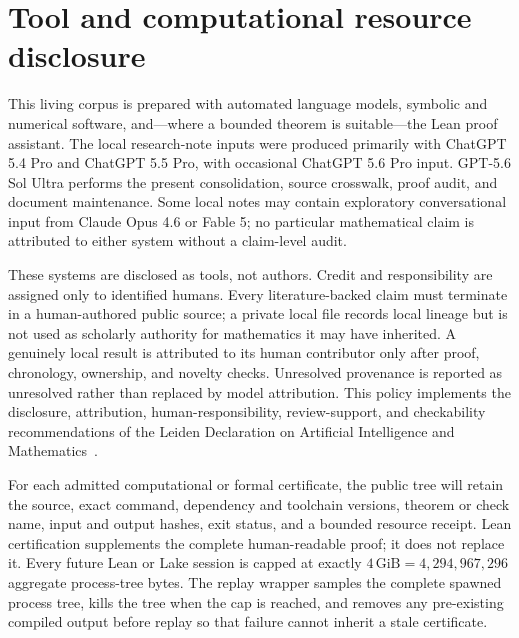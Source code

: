 \section{Tool and computational resource disclosure}
\label{sec:tool-disclosure}

This living corpus is prepared with automated language models, symbolic and numerical
software, and---where a bounded theorem is suitable---the Lean proof assistant.  The local
research-note inputs were produced primarily with ChatGPT 5.4 Pro and ChatGPT 5.5 Pro,
with occasional ChatGPT 5.6 Pro input.  GPT-5.6 Sol Ultra performs the present consolidation,
source crosswalk, proof audit, and document maintenance.  Some local notes may contain
exploratory conversational input from Claude Opus 4.6 or Fable 5; no particular mathematical
claim is attributed to either system without a claim-level audit.

These systems are disclosed as tools, not authors.  Credit and responsibility are assigned
only to identified humans.  Every literature-backed claim must terminate in a human-authored
public source; a private local file records local lineage but is not used as scholarly
authority for mathematics it may have inherited.  A genuinely local result is attributed to
its human contributor only after proof, chronology, ownership, and novelty checks.  Unresolved
provenance is reported as unresolved rather than replaced by model attribution.  This policy
implements the disclosure, attribution, human-responsibility, review-support, and
checkability recommendations of the Leiden Declaration on Artificial Intelligence and
Mathematics~\cite[Recommendations for individual mathematicians]{leiden2026}.

For each admitted computational or formal certificate, the public tree will retain the
source, exact command, dependency and toolchain versions, theorem or check name, input and
output hashes, exit status, and a bounded resource receipt.  Lean certification supplements
the complete human-readable proof; it does not replace it.  Every future Lean or Lake session
is capped at exactly $4\,\mathrm{GiB}=4{,}294{,}967{,}296$ aggregate process-tree bytes.  The
replay wrapper samples the complete spawned process tree, kills the tree when the cap is reached,
and removes any pre-existing compiled output before replay so that failure cannot inherit a
stale certificate.

